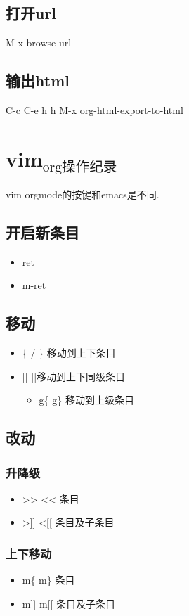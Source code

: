 \documentclass[12pt,a4paper]{article}
\begin{document}
\subsection{打开url}
\label{sec:orgheadline76}
M-x browse-url

\subsection{输出html}
\label{sec:orgheadline77}
C-c C-e h h
M-x org-html-export-to-html
\section{vim\(_{\text{org操作纪录}}\)}
\label{sec:orgheadline85}
vim orgmode的按键和emacs是不同.
\subsection{开启新条目}
\label{sec:orgheadline79}
\begin{itemize}
\item ret
\item m-ret
\end{itemize}
\subsection{移动}
\label{sec:orgheadline80}
\begin{itemize}
\item \{ / \} 移动到上下条目
\item ]] [[移动到上下同级条目
\begin{itemize}
\item g\{ g\} 移动到上级条目
\end{itemize}
\end{itemize}
\subsection{改动}
\label{sec:orgheadline83}
\subsubsection{升降级}
\label{sec:orgheadline81}
\begin{itemize}
\item >> <<  条目
\item >]] <[[ 条目及子条目
\end{itemize}
\subsubsection{上下移动}
\label{sec:orgheadline82}
\begin{itemize}
\item m\{ m\} 条目
\item m]] m[[ 条目及子条目
\end{itemize}
\end{document}

